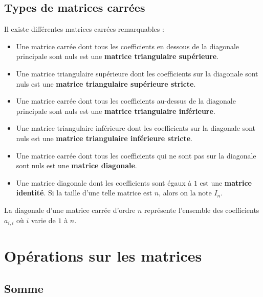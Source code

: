 	\subsection{Types de matrices carrées}
	
	\begin{formula}
		Il existe différentes matrices carrées remarquables :
		\begin{itemize}
			\item Une matrice carrée dont tous les coefficients en dessous de la diagonale principale sont nuls est une \textbf{matrice triangulaire supérieure}.
			\item Une matrice triangulaire supérieure dont les coefficients sur la diagonale sont nuls est une \textbf{matrice triangulaire supérieure stricte}.
			\item Une matrice carrée dont tous les coefficients au-dessus de la diagonale principale sont nuls est une \textbf{matrice triangulaire inférieure}.
			\item Une matrice triangulaire inférieure dont les coefficients sur la diagonale sont nuls est une \textbf{matrice triangulaire inférieure stricte}.
			\item Une matrice carrée dont tous les coefficients qui ne sont pas sur la diagonale sont nuls est une \textbf{matrice diagonale}.
			\item Une matrice diagonale dont les coefficients sont égaux à $1$ est une \textbf{matrice identité}. Si la taille d'une telle matrice est $n$, alors on la note $I_n$.
		\end{itemize}
	\end{formula}
	
	\begin{tip}
		La diagonale d'une matrice carrée d'ordre $n$ représente l'ensemble des coefficients $a_{i,i}$ où $i$ varie de $1$ à $n$.
	\end{tip}
	
	\section{Opérations sur les matrices}
	
	\subsection{Somme}
	
